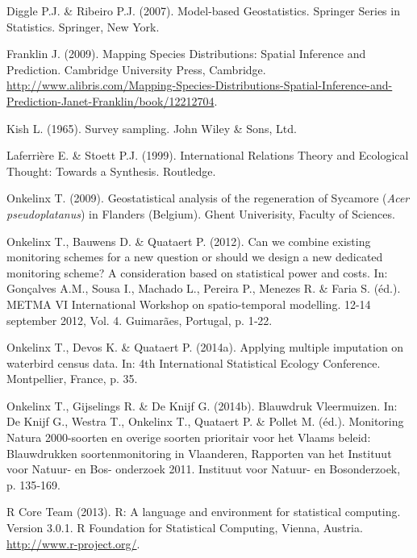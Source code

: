 \documentclass[twoside]{extreport}
\begin{document}
\begin{CSLReferences}{1}{0}
\leavevmode{}%
Diggle P.J. \& Ribeiro P.J. (2007). {Model-based Geostatistics}.
Springer Series in Statistics. Springer, New York.

\leavevmode{}%
Franklin J. (2009). Mapping {Species} {Distributions}: {Spatial}
{Inference} and {Prediction}. Cambridge University Press, Cambridge.
\url{http://www.alibris.com/Mapping-Species-Distributions-Spatial-Inference-and-Prediction-Janet-Franklin/book/12212704}.

\leavevmode{}%
Kish L. (1965). {Survey sampling}. John Wiley \& Sons, Ltd.

\leavevmode{}%
Laferrière E. \& Stoett P.J. (1999). International Relations Theory and
Ecological Thought: Towards a Synthesis. Routledge.

\leavevmode{}%
Onkelinx T. (2009). {Geostatistical analysis of the regeneration of
Sycamore (\emph{Acer pseudoplatanus}) in Flanders (Belgium)}. Ghent
Univerisity, Faculty of Sciences.

\leavevmode{}%
Onkelinx T., Bauwens D. \& Quataert P. (2012). {Can we combine existing
monitoring schemes for a new question or should we design a new
dedicated monitoring scheme? A consideration based on statistical power
and costs.} In: Gonçalves A.M., Sousa I., Machado L., Pereira P.,
Menezes R. \& Faria S. (éd.). METMA VI International Workshop on
spatio-temporal modelling. 12-14 september 2012, Vol. 4. Guimarães,
Portugal, p. 1‑22.

\leavevmode{}%
Onkelinx T., Devos K. \& Quataert P. (2014a). {Applying multiple
imputation on waterbird census data}. In: 4th {International Statistical
Ecology Conference}. Montpellier, France, p. 35.

\leavevmode{}%
Onkelinx T., Gijselings R. \& De Knijf G. (2014b). {Blauwdruk
Vleermuizen}. In: De Knijf G., Westra T., Onkelinx T., Quataert P. \&
Pollet M. (éd.). Monitoring Natura 2000-soorten en overige soorten
prioritair voor het Vlaams beleid: Blauwdrukken soortenmonitoring in
Vlaanderen, Rapporten van het Instituut voor Natuur- en Bos- onderzoek
2011. Instituut voor Natuur- en Bosonderzoek, p. 135‑169.

\leavevmode{}%
R Core Team (2013). {R: A language and environment for statistical
computing. Version 3.0.1}. R Foundation for Statistical Computing,
Vienna, Austria. \url{http://www.r-project.org/}.


\end{CSLReferences}
\end{document}
